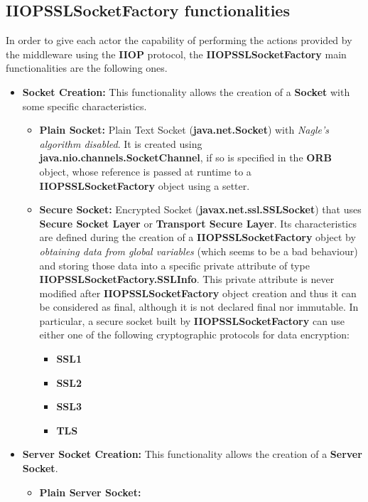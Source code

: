 \subsection{IIOPSSLSocketFactory functionalities}
In order to give each actor the capability of performing the actions provided by the middleware using the \textbf{IIOP} protocol, the \textbf{IIOPSSLSocketFactory} main functionalities are the following ones.
\begin{itemize}
	\item \textbf{Socket Creation:}
		This functionality allows the creation of a \textbf{Socket} with some specific characteristics.
		\begin{itemize}
			\item \textbf{Plain Socket:}
				Plain Text Socket (\textbf{java.net.Socket}) with \textit{Nagle's algorithm disabled}.
				It is created using \textbf{java.nio.channels.SocketChannel}, if so is specified in the \textbf{ORB} object, whose reference is passed at runtime to a \textbf{IIOPSSLSocketFactory} object using a setter.
			\item \textbf{Secure Socket:}
				Encrypted Socket (\textbf{javax.net.ssl.SSLSocket}) that uses \textbf{Secure Socket Layer} or \textbf{Transport Secure Layer}.
				Its characteristics are defined during the creation of a \textbf{IIOPSSLSocketFactory} object by \textit{obtaining data from global variables} (which seems to be a bad behaviour) and storing those data into a specific private attribute of type \textbf{IIOPSSLSocketFactory.SSLInfo}.
				This private attribute is never modified after \textbf{IIOPSSLSocketFactory} object creation and thus it can be considered as final, although it is not declared final nor immutable.
				In particular, a secure socket built by \textbf{IIOPSSLSocketFactory} can use either one of the following cryptographic protocols for data encryption:
				\begin{itemize}
					\item \textbf{SSL1} 
					\item \textbf{SSL2}
					\item \textbf{SSL3}
					\item \textbf{TLS}
				\end{itemize}
		\end{itemize}
	\item \textbf{Server Socket Creation:}
		This functionality allows the creation of a \textbf{Server Socket}.
		\begin{itemize}
			\item \textbf{Plain Server Socket:}

\end{itemize}
\end{itemize}
